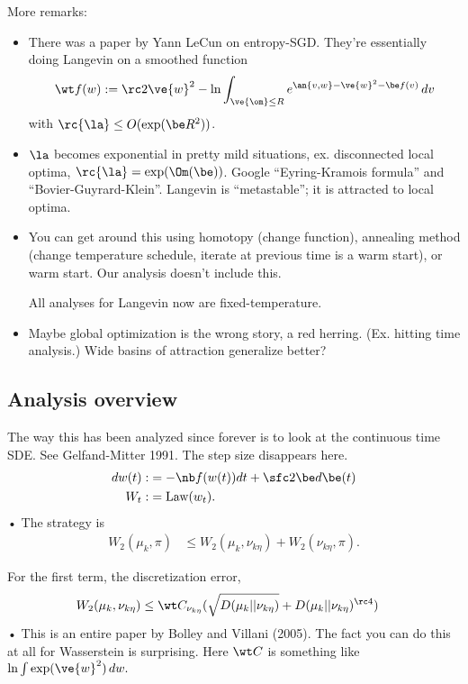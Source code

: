 More remarks:
\begin{itemize}
\item
There was a paper by Yann LeCun on entropy-SGD. They're essentially doing Langevin on a smoothed function
$$
\wt f(w) :=\rc2\ve{w}^2 - \ln \int_{\ve{\om}\le R} e^{\an{v,w} - \ve{w}^2 - \be f(v)}\,dv
$$
with $\rc{\la} \le O(\exp(\be R^2))$. 
%
\item
$\la$ becomes exponential in pretty mild situations, ex.  disconnected local optima, $\rc{\la} = \exp(\Om(\be))$. Google ``Eyring-Kramois formula'' and ``Bovier-Guyrard-Klein''. Langevin is ``metastable''; it is attracted to local optima.
\item
You can get around this using homotopy (change function), annealing method (change temperature schedule, iterate at previous time is a warm start), or warm start. Our analysis doesn't include this.

All analyses for Langevin now are fixed-temperature.
\item
Maybe global optimization is the wrong story, a red herring. (Ex. hitting time analysis.) Wide basins of attraction generalize better?
\end{itemize}

\subsection{Analysis overview}

The way this has been analyzed since forever is to look at the continuous time SDE. See Gelfand-Mitter 1991. The step size disappears here.
\begin{align}
dw(t) :&= - \nb f(w(t)) dt + \sfc 2\be d\be (t)\\
W_t:&= \text{Law}(w_t).
\end{align}•
The strategy is
\begin{align}
W_2(\mu_k, \pi) &\le W_2(\mu_k, \nu_{k\eta}) + W_2(\nu_{k\eta}, \pi).
\end{align}

For the first term, the discretization error, 
\begin{align}
W_2(\mu_k, \nu_{k\eta}) &\le \wt C_{\nu_{k\eta}}(
\sqrt{D(\mu_k||\nu_{k\eta})} + D(\mu_k||\nu_{k\eta})^{\rc 4}
)
\end{align}•
This is an entire paper by Bolley and Villani (2005). The fact you can do this at all for Wasserstein is surprising.
Here $\wt C$ is something like $\ln \int \exp(\ve{w}^2)\,dw.$

